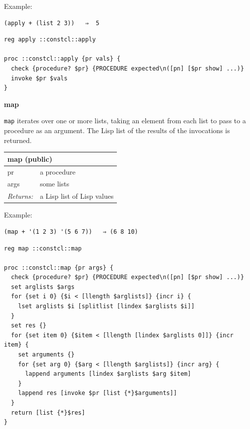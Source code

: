 \documentclass[twoside,9pt]{report}
\begin{document}
Example:

\noindent\makebox[\linewidth]{\rule{\linewidth}{0.4pt}}
\begin{lstlisting}
(apply + (list 2 3))   ⇒  5
\end{lstlisting}
\noindent\makebox[\linewidth]{\rule{\linewidth}{0.4pt}}
\noindent\makebox[\linewidth]{\rule{\linewidth}{0.4pt}}
\begin{lstlisting}
reg apply ::constcl::apply
 
proc ::constcl::apply {pr vals} {
  check {procedure? $pr} {PROCEDURE expected\n([pn] [$pr show] ...)}
  invoke $pr $vals
}
\end{lstlisting}
\noindent\makebox[\linewidth]{\rule{\linewidth}{0.4pt}}

\textbf{map}


\texttt{map} iterates over one or more lists, taking an element from each list to pass to a procedure as an argument. The Lisp list of the results of the invocations is returned.

\begin{tabular}{ |l l| }
\hline
\multicolumn{2}{|l|}{map (public)} \\
\hline
pr & a procedure \\
args & some lists \\
\textit{Returns:} & a Lisp list of Lisp values \\
\hline
\end{tabular}


Example:

\noindent\makebox[\linewidth]{\rule{\linewidth}{0.4pt}}
\begin{lstlisting}
(map + '(1 2 3) '(5 6 7))   ⇒ (6 8 10)
\end{lstlisting}
\noindent\makebox[\linewidth]{\rule{\linewidth}{0.4pt}}
\noindent\makebox[\linewidth]{\rule{\linewidth}{0.4pt}}
\begin{lstlisting}
reg map ::constcl::map
 
proc ::constcl::map {pr args} {
  check {procedure? $pr} {PROCEDURE expected\n([pn] [$pr show] ...)}
  set arglists $args
  for {set i 0} {$i < [llength $arglists]} {incr i} {
    lset arglists $i [splitlist [lindex $arglists $i]]
  }
  set res {}
  for {set item 0} {$item < [llength [lindex $arglists 0]]} {incr item} {
    set arguments {}
    for {set arg 0} {$arg < [llength $arglists]} {incr arg} {
      lappend arguments [lindex $arglists $arg $item]
    }
    lappend res [invoke $pr [list {*}$arguments]]
  }
  return [list {*}$res]
}
\end{lstlisting}
\noindent\makebox[\linewidth]{\rule{\linewidth}{0.4pt}}
\end{document}
